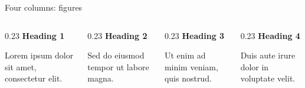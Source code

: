 \begin{frame}[t]{Four columns: figures}
    \begin{columns}[T,onlytextwidth]
        \begin{column}{0.23\textwidth}
            \textbf{Heading 1}\par\medskip
            \par\medskip Lorem ipsum dolor sit amet, consectetur elit.
        \end{column}
        \begin{column}{0.23\textwidth}
            \textbf{Heading 2}\par\medskip
            \par\medskip Sed do eiusmod tempor ut labore magna.
        \end{column}
        \begin{column}{0.23\textwidth}
            \textbf{Heading 3}\par\medskip
            \par\medskip Ut enim ad minim veniam, quis nostrud.
        \end{column}
        \begin{column}{0.23\textwidth}
            \textbf{Heading 4}\par\medskip
            \par\medskip Duis aute irure dolor in voluptate velit.
        \end{column}
    \end{columns}
\end{frame}

